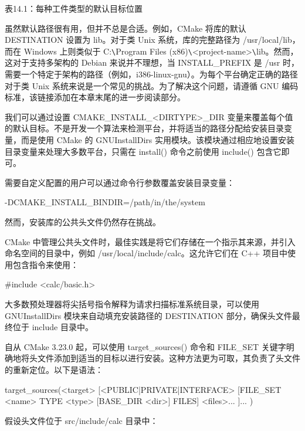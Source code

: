 \begin{center}
表14.1：每种工件类型的默认目标位置
\end{center}

虽然默认路径很有用，但并不总是合适。例如，CMake 将库的默认 DESTINATION 设置为 lib。对于类 Unix 系统，库的完整路径为 /usr/local/lib，而在 Windows 上则类似于 C:\verb|\|Program Files (x86)\verb|\|<project-name>\verb|\|lib。然而，这对于支持多架构的 Debian 来说并不理想，当 INSTALL\_PREFIX 是 /usr 时，需要一个特定于架构的路径（例如，i386-linux-gnu）。为每个平台确定正确的路径对于类 Unix 系统来说是一个常见的挑战。为了解决这个问题，请遵循 GNU 编码标准，该链接添加在本章末尾的进一步阅读部分。

我们可以通过设置 CMAKE\_INSTALL\_<DIRTYPE>\_DIR 变量来覆盖每个值的默认目标。不是开发一个算法来检测平台，并将适当的路径分配给安装目录变量，而是使用 CMake 的 GNUInstallDirs 实用模块。该模块通过相应地设置安装目录变量来处理大多数平台，只需在 install() 命令之前使用 include() 包含它即可。

需要自定义配置的用户可以通过命令行参数覆盖安装目录变量：

\begin{shell}
-DCMAKE_INSTALL_BINDIR=/path/in/the/system
\end{shell}

然而，安装库的公共头文件仍然存在挑战。


CMake 中管理公共头文件时，最佳实践是将它们存储在一个指示其来源，并引入命名空间的目录中，例如 /usr/local/include/calc。这允许它们在 C++ 项目中使用包含指令来使用：

\begin{cpp}
#include <calc/basic.h>
\end{cpp}

大多数预处理器将尖括号指令解释为请求扫描标准系统目录，可以使用 GNUInstallDirs 模块来自动填充安装路径的 DESTINATION 部分，确保头文件最终位于 include 目录中。

自从 CMake 3.23.0 起，可以使用 target\_sources() 命令和 FILE\_SET 关键字明确地将头文件添加到适当的目标以进行安装。这种方法更为可取，其负责了头文件的重新定位。以下是语法：

\begin{shell}
target_sources(<target>
    [<PUBLIC|PRIVATE|INTERFACE>
        [FILE_SET <name> TYPE <type> [BASE_DIR <dir>] FILES]
        <files>...
    ]...
)
\end{shell}

假设头文件位于 src/include/calc 目录中：

